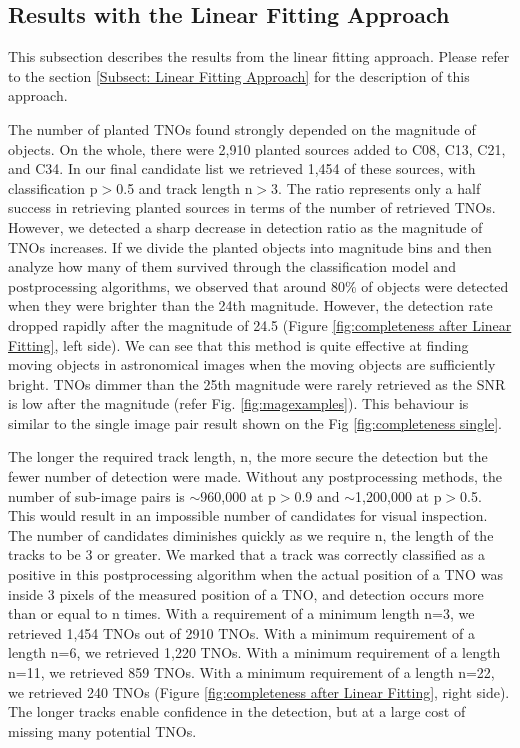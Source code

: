 \subsection{Results with the Linear Fitting Approach}
\label{subsect:Retrieval rate on planted TNOs}

This subsection describes the results from the linear fitting approach.
Please refer to the section \ref{Subsect: Linear Fitting Approach} for the description of this approach.

The number of planted TNOs found strongly depended on the magnitude of objects.
On the whole, there were 2,910 planted sources added to C08, C13, C21, and C34.
In our final candidate list we retrieved 1,454 of these sources, with classification p$>$0.5 and track length n$>$3.
The ratio represents only a half success in retrieving planted sources in terms of the number of retrieved TNOs.
However, we detected a sharp decrease in detection ratio as the magnitude of TNOs increases.
If we divide the planted objects into magnitude bins and then analyze how many of them survived through the classification model and postprocessing algorithms, we observed that around 80\% of objects were detected when they were brighter than the 24th magnitude.
However, the detection rate dropped rapidly after the magnitude of 24.5 (Figure \ref{fig:completeness after Linear Fitting}, left side).
We can see that this method is quite effective at finding moving objects in astronomical images when the moving objects are sufficiently bright.
TNOs dimmer than the 25th magnitude were rarely retrieved as the SNR is low after the magnitude (refer Fig. \ref{fig:magexamples}). 
This behaviour is similar to the single image pair result shown on the Fig \ref{fig:completeness single}.

The longer the required track length, n, the more secure the detection but the fewer number of detection were made.
Without any postprocessing methods, the number of sub-image pairs is $\sim$960,000 at p$>$0.9 and $\sim$1,200,000 at p$>$0.5.
This would result in an impossible number of candidates for visual inspection.
The number of candidates diminishes quickly as we require n, the length of the tracks to be 3 or greater.
We marked that a track was correctly classified as a positive in this postprocessing algorithm when the actual position of a TNO was inside 3 pixels of the measured position of a TNO, and detection occurs more than or equal to n times.
With a requirement of a minimum length n=3, we retrieved 1,454 TNOs out of 2910 TNOs.
With a minimum requirement of a length n=6, we retrieved 1,220 TNOs.
With a minimum requirement of a length n=11, we retrieved 859 TNOs.
With a minimum requirement of a length n=22, we retrieved 240 TNOs (Figure \ref{fig:completeness after Linear Fitting}, right side).
The longer tracks enable confidence in the detection, but at a large cost of missing many potential TNOs.

